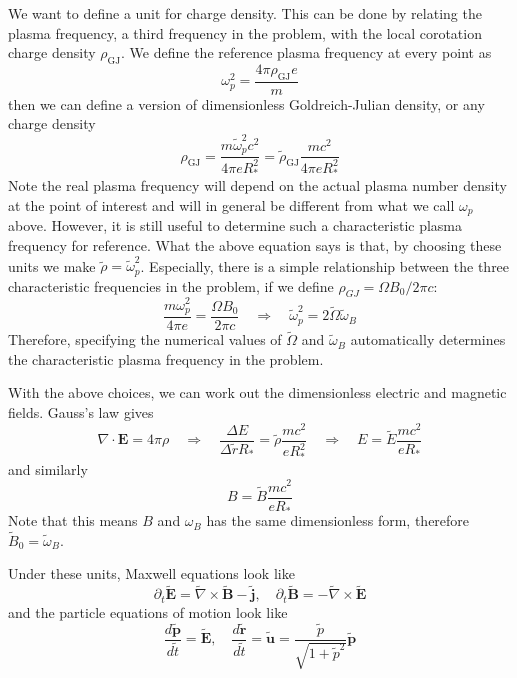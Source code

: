 We want to define a unit for charge density. This can be done by relating the
plasma frequency, a third frequency in the problem, with the local corotation
charge density $\rho_\mathrm{GJ}$. We define the reference plasma frequency at every
point as
\begin{equation}
  \omega_p^2 = \frac{4\pi \rho_\mathrm{GJ}e}{m}
\end{equation}
then we can define a version of dimensionless Goldreich-Julian density, or any charge density
\begin{equation}
  \rho_\mathrm{GJ} = \frac{m \tilde{\omega}_p^2 c^2}{4\pi e R_{*}^2} = \tilde{\rho}_\mathrm{GJ} \frac{mc^2}{4\pi eR_{*}^2}
\end{equation}
Note the real plasma frequency will depend on the actual plasma number density
at the point of interest and will in general be different from what we call
$\omega_p$ above. However, it is still useful to determine such a characteristic
plasma frequency for reference. What the above equation says is that, by
choosing these units we make $\tilde{\rho} = \tilde{\omega}_p^2$. Especially,
there is a simple relationship between the three characteristic frequencies in
the problem, if we define $\rho_{GJ} = \Omega B_0 / 2\pi c$:
\begin{equation}
  \frac{m \omega_p^2}{4\pi e} = \frac{\Omega B_0}{2\pi c} \quad \Longrightarrow \quad \tilde{\omega}_p^2 = 2\tilde{\Omega} \tilde{\omega}_B
\end{equation}
Therefore, specifying the numerical values of $\tilde{\Omega}$ and
$\tilde{\omega}_B$ automatically determines the characteristic plasma frequency
in the problem.

With the above choices, we can work out the dimensionless electric and magnetic
fields. Gauss's law gives
\begin{equation}
  \nabla\cdot \mathbf{E} = 4\pi \rho \quad \Longrightarrow \quad \frac{\Delta E}{\Delta \tilde{r} R_{*}} = \tilde{\rho} \frac{m c^2}{e R_{*}^2} \quad \Longrightarrow \quad E = \tilde{E}\frac{m c^2}{e R_{*}}
\end{equation}
and similarly
\begin{equation}
    B = \tilde{B}\frac{m c^2}{e R_{*}}
\end{equation}
Note that this means $B$ and $\omega_B$ has the same dimensionless form,
therefore $\tilde{B}_0 = \tilde{\omega}_B$.

Under these units, Maxwell equations look like
\begin{equation}
  \partial_t \tilde{\mathbf{E}} = \tilde{\nabla}\times \tilde{\mathbf{B}} - \tilde{\mathbf{j}},\quad \partial_t \tilde{\mathbf{B}} = - \tilde{\nabla}\times \tilde{\mathbf{E}}
\end{equation}
and the particle equations of motion look like
\begin{equation}
  \frac{d \tilde{\mathbf{p}}}{d \tilde{t}} = \tilde{\mathbf{E}},\quad \frac{d \tilde{\mathbf{r}}}{d \tilde{t}} = \tilde{\mathbf{u}} = \frac{\tilde{p}}{\sqrt{1 + \tilde{p}^2}} \tilde{\mathbf{p}}
\end{equation}

